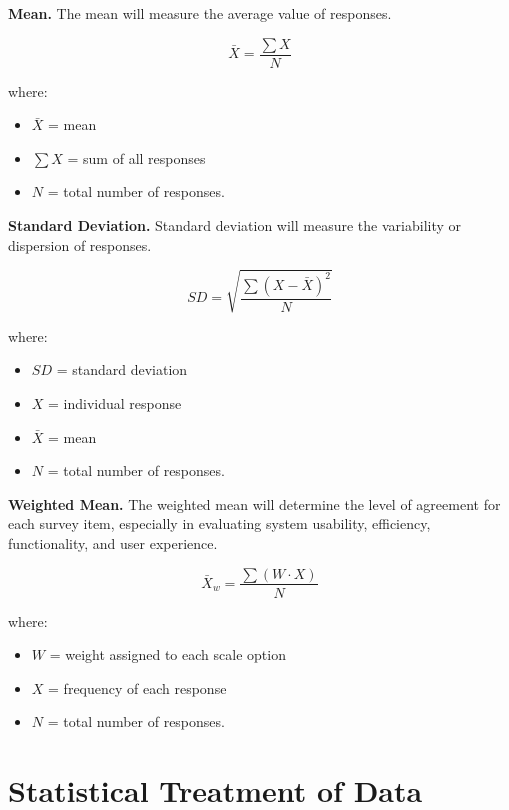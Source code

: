 \documentclass{research}
\begin{document}
\indent\textbf{Mean.} The mean will measure the average value of responses.

\begin{equation}
    \bar{X} = \frac{\sum X}{N}
\end{equation}

\noindent where:
\begin{itemize}
    \item[] $\bar{X}$ = mean
    \item[] $\sum X$ = sum of all responses
    \item[] $N$ = total number of responses.
\end{itemize}

\indent\textbf{Standard Deviation.} Standard deviation will measure the variability or dispersion of responses.

\begin{equation}
    SD = \sqrt{\frac{\sum (X - \bar{X})^2}{N}}
\end{equation}

\noindent where:
\begin{itemize}
    \item[] $SD$ = standard deviation
    \item[] $X$ = individual response
    \item[] $\bar{X}$ = mean
    \item[] $N$ = total number of responses.
\end{itemize}

\indent\textbf{Weighted Mean.} The weighted mean will determine the level of agreement for each survey item, especially in evaluating system usability, efficiency, functionality, and user experience.

\begin{equation}
    \bar{X}_w = \frac{\sum (W \cdot X)}{N}
\end{equation}

\noindent where:
\begin{itemize}
    \item[] $W$ = weight assigned to each scale option
    \item[] $X$ = frequency of each response
    \item[] $N$ = total number of responses.
\end{itemize}

\section{Statistical Treatment of Data}
\end{document}
